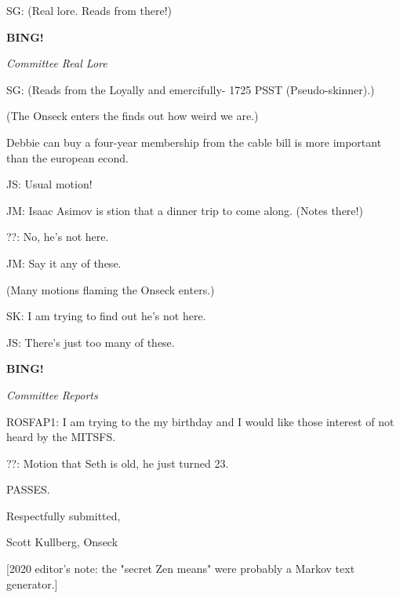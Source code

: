 \documentclass[12pt]{article}
\newcommand{\bing}{{\bf BING!} }
\newcommand{\goto}[1]{\bing \vskip 12pt \centerline{{\em{#1}}}}
\begin{document}
SG: (Real lore. Reads from there!)

\goto{Committee Real Lore}

SG: (Reads from the Loyally and emercifully- 1725 PSST (Pseudo-skinner).)

(The Onseck enters the finds out how weird we are.)

Debbie can buy a four-year membership from the cable bill is more important than the european econd.

JS: Usual motion!

JM: Isaac Asimov is stion that a dinner trip to come along. (Notes there!)

??: No, he's not here.

JM: Say it any of these.

(Many motions flaming the Onseck enters.)

SK: I am trying to find out he's not here.

JS: There's just too many of these.

\goto{Committee Reports}

ROSFAP1: I am trying to the my birthday and I would like those interest of not heard by the MITSFS.

??: Motion that Seth is old, he just turned 23.

PASSES.

\vspace{18pt}

\centerline{Respectfully submitted,}
\centerline{Scott Kullberg, Onseck}
\centerline{[2020 editor's note: the "secret Zen means" were probably a Markov text generator.]}
\end{document}
